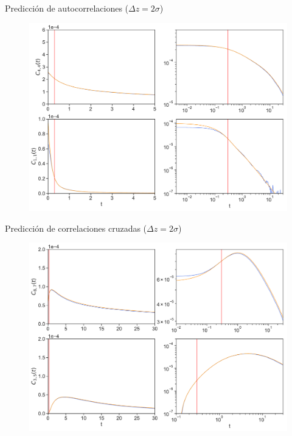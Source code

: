 \documentclass{beamer}
\begin{document}
\begin{frame}{Predicción de autocorrelaciones ($\Delta z=2\sigma$)}
\begin{figure}[h!]
\includegraphics[width=\linewidth]{Predictions-WALLS-17nodes-defense}
\end{figure}
\end{frame}

\begin{frame}{Predicción de correlaciones cruzadas ($\Delta z=2\sigma$)}
\begin{figure}[h!]
\includegraphics[width=\linewidth]{PredictionsCross-WALLS-17nodes}
\end{figure}
\end{frame}
\end{document}
